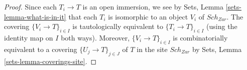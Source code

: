 \documentclass[10pt,a4paper]{amsart}
\theoremstyle{plain}
\theoremstyle{definition}
\theoremstyle{remark}
\numberwithin{equation}{subsection}
\def\Sch{\mathit{Sch}}
\begin{document}
\begin{proof}
Since each $T_i \to T$ is an open immersion, we see by
Sets, Lemma \ref{sets-lemma-what-is-in-it}
that each $T_i$ is isomorphic to an object $V_i$ of $\Sch_{Zar}$.
The covering $\{V_i \to T\}_{i \in I}$ is tautologically equivalent
to $\{T_i \to T\}_{i \in I}$ (using the identity map on $I$ both ways).
Moreover, $\{V_i \to T\}_{i \in I}$ is combinatorially equivalent to a
covering $\{U_j \to T\}_{j \in J}$ of $T$ in the site $\Sch_{Zar}$ by
Sets, Lemma \ref{sets-lemma-coverings-site}.
\end{proof}
\end{document}

